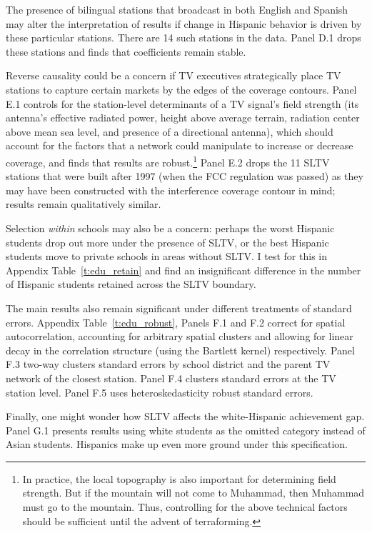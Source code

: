 \documentclass[11pt]{article}
\begin{document}
The presence of bilingual stations that broadcast in both English and Spanish may alter the interpretation of results if change in Hispanic behavior is driven by these particular stations. There are 14 such stations in the data. Panel D.1 drops these stations and finds that coefficients remain stable. 

Reverse causality could be a concern if TV executives strategically place TV stations to capture certain markets by the edges of the coverage contours. Panel E.1 controls for the station-level determinants of a TV signal's field strength (its antenna's effective radiated power, height above average terrain, radiation center above mean sea level, and presence of a directional antenna), which should account for the factors that a network could manipulate to increase or decrease coverage, and finds that results are robust.\footnote{In practice, the local topography is also important for determining field strength. But if the mountain will not come to Muhammad, then Muhammad must go to the mountain. Thus, controlling for the above technical factors should be sufficient until the advent of terraforming.} Panel E.2 drops the 11 SLTV stations that were built after 1997 (when the FCC regulation was passed) as they may have been constructed with the interference coverage contour in mind; results remain qualitatively similar.

Selection \textit{within} schools may also be a concern: perhaps the worst Hispanic students drop out more under the presence of SLTV, or the best Hispanic students move to private schools in areas without SLTV. I test for this in Appendix Table~\ref{t:edu_retain} and find an insignificant difference in the number of Hispanic students retained across the SLTV boundary.

The main results also remain significant under different treatments of standard errors. Appendix Table~\ref{t:edu_robust}, Panels F.1 and F.2 correct for spatial autocorrelation, accounting for arbitrary spatial clusters and allowing for linear decay in the correlation structure (using the Bartlett kernel) respectively. Panel F.3 two-way clusters standard errors by school district and the parent TV network of the closest station. Panel F.4 clusters standard errors at the TV station level. Panel F.5 uses heteroskedasticity robust standard errors.

Finally, one might wonder how SLTV affects the white-Hispanic achievement gap. Panel G.1 presents results using white students as the omitted category instead of Asian students. Hispanics make up even more ground under this specification.
\end{document}
